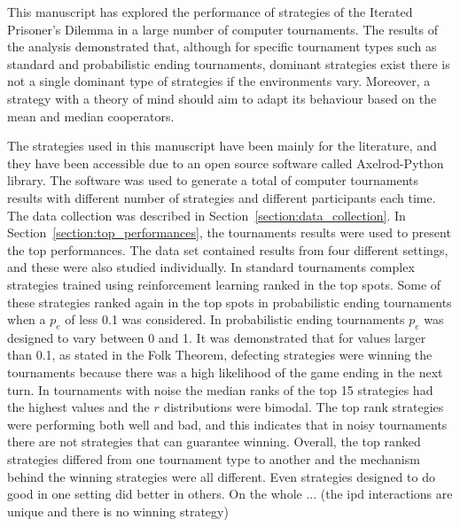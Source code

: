 \documentclass{article}
\newcommand{\numberofalltournaments}{}
\newcommand{\numberofstrategies}{}
\begin{document}
This manuscript has explored the performance of \numberofstrategies strategies of the Iterated
Prisoner's Dilemma in a large number of computer tournaments. The results of
the analysis demonstrated that, although for specific tournament types such as
standard and probabilistic ending tournaments, dominant strategies exist
there is not a single dominant type of strategies if the environments
vary. Moreover, a strategy with a theory of mind should aim to adapt its behaviour
based on the mean and median cooperators.

The \numberofstrategies strategies used in this manuscript have been mainly for
the literature, and they have been accessible due to an open source software
called Axelrod-Python library. The software was used to generate a total of
\numberofalltournaments computer tournaments results with different number of
strategies and different participants each time. The data collection was
described in Section~\ref{section:data_collection}. In
Section~\ref{section:top_performances}, the tournaments results were used to
present the top performances. The data set contained results from four different
settings, and these were also studied individually. In standard tournaments
complex strategies trained using reinforcement learning ranked in the top spots.
Some of these strategies ranked again in the top spots in probabilistic
ending tournaments when a \(p_e\) of less 0.1 was considered. In probabilistic
ending tournaments \(p_e\) was designed to vary between 0 and 1. It was demonstrated
that for values larger than 0.1, as stated in the Folk Theorem, defecting strategies
were winning the tournaments because there was a high likelihood of the game
ending in the next turn. In tournaments with noise the median ranks of the top
15 strategies had the highest values and the \(r\) distributions were bimodal.
The top rank strategies were performing both well and bad, and this indicates
that in noisy tournaments there are not strategies that can guarantee winning.
Overall, the top ranked strategies differed from one tournament type to
another and the mechanism behind the winning strategies were all different.
Even strategies designed to do good in one setting did better in others.
On the whole ... (the ipd interactions are unique and there is no winning
strategy) %
\end{document}
